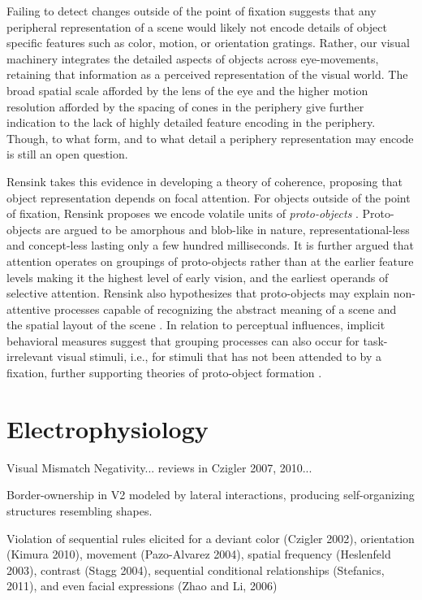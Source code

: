 \documentclass[a4paper,10pt,final]{ThesisStyle}
\begin{document}
Failing to detect changes outside of the point of fixation suggests that any peripheral representation of a scene would likely not encode details of object specific features such as color, motion, or orientation gratings.  Rather, our visual machinery integrates the detailed aspects of objects across eye-movements, retaining that information as a perceived representation of the visual world.  The broad spatial scale afforded by the lens of the eye and the higher motion resolution afforded by the spacing of cones in the periphery give further indication to the lack of highly detailed feature encoding in the periphery.  Though, to what form, and to what detail a periphery representation may encode is still an open question.  

Rensink takes this evidence in developing a theory of coherence, proposing that object representation depends on focal attention.  For objects outside of the point of fixation, Rensink proposes we encode volatile units of \textit{proto-objects} \cite{Rensink2000,Rensink2001}.  Proto-objects are argued to be amorphous and blob-like in nature, representational-less and concept-less lasting only a few hundred milliseconds.  It is further argued that attention operates on groupings of proto-objects rather than at the earlier feature levels making it the highest level of early vision, and the earliest operands of selective attention.  Rensink also hypothesizes that proto-objects may explain non-attentive processes capable of recognizing the abstract meaning of a scene and the spatial layout of the scene \cite{Rensink2002}.  In relation to perceptual influences, implicit behavioral measures suggest that grouping processes can also occur for task-irrelevant visual stimuli, i.e., for stimuli that has not been attended to by a fixation, further supporting theories of proto-object formation \cite{Lamy2006}.

\section{Electrophysiology}\label{sec:electrophysiology}

Visual Mismatch Negativity... reviews in Czigler 2007, 2010...
\cite{Stefanics2011}

Border-ownership in V2 modeled by lateral interactions, producing self-organizing structures resembling shapes.

Violation of sequential rules elicited for a deviant color (Czigler 2002), orientation (Kimura 2010), movement (Pazo-Alvarez 2004), spatial frequency (Heslenfeld 2003), contrast (Stagg 2004), sequential conditional relationships (Stefanics, 2011), and even facial expressions (Zhao and Li, 2006)
\end{document}
